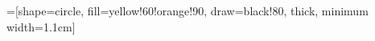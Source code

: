 
\usepackage{tikz}

=[shape=circle,
	       fill=yellow!60!orange!90,
	       draw=black!80,
	       thick,
	       minimum width=1.1cm]

